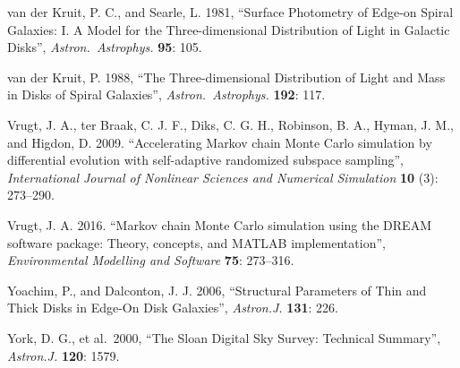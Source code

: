 \documentclass[10pt,a4paper,article]{memoir}
\begin{document}
\begin{thebibliography}{}
 van der Kruit, P. C., and
Searle, L. 1981, ``Surface Photometry of Edge-on Spiral Galaxies: I. A
Model for the Three-dimensional Distribution of Light in Galactic
Disks'', \textit{Astron.\ Astrophys.} \textbf{95}: 105.

 van der Kruit, P. 1988, ``The
Three-dimensional Distribution of Light and Mass in Disks of Spiral
Galaxies'', \textit{Astron.\ Astrophys.} \textbf{192}: 117.

 Vrugt, J. A., ter Braak, C. J. F.,
Diks, C. G. H., Robinson, B. A., Hyman, J. M., and Higdon, D. 2009.
``Accelerating Markov chain Monte Carlo simulation by differential
evolution with self-adaptive randomized subspace sampling'',
\textit{International Journal of Nonlinear Sciences and Numerical
Simulation} \textbf{10} (3): 273--290.

 Vrugt, J. A. 2016. ``Markov chain Monte
Carlo simulation using the DREAM software package: Theory, concepts, and
MATLAB implementation'', \textit{Environmental Modelling and Software}
\textbf{75}: 273--316.

 Yoachim, P., and Dalconton, J. J.
2006, ``Structural Parameters of Thin and Thick Disks in Edge-On Disk
Galaxies'', \textit{Astron.J.} \textbf{131}: 226.

 York, D. G., et al.\ 2000, ``The Sloan Digital 
Sky Survey: Technical Summary'', \textit{Astron.J.} \textbf{120}: 1579.


\end{thebibliography}
%
\end{document}
